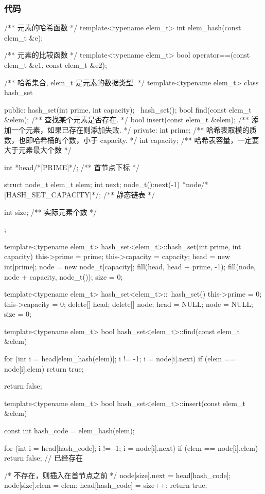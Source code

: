 \subsubsection{代码}
\begin{Codex}[label=hash_set.hpp]
/** 元素的哈希函数  */
template<typename elem_t>
int elem_hash(const elem_t &e);

/** 元素的比较函数  */
template<typename elem_t>
bool operator==(const elem_t &e1, const elem_t &e2);

/** 哈希集合, elem_t 是元素的数据类型. */
template<typename elem_t>
class hash_set {
public:
    hash_set(int prime, int capacity);
    ~hash_set();
    bool find(const elem_t &elem); /** 查找某个元素是否存在. */
    bool insert(const elem_t &elem); /** 添加一个元素，如果已存在则添加失败. */
private:
    int prime; /** 哈希表取模的质数，也即哈希桶的个数，小于 capacity. */
    int capacity; /** 哈希表容量，一定要大于元素最大个数  */

    int *head/*[PRIME]*/; /** 首节点下标 */

    struct node_t {
        elem_t elem;
        int next;
        node_t():next(-1) {}
    } *node/*[HASH_SET_CAPACITY]*/; /** 静态链表 */

    int size; /** 实际元素个数 */
};

template<typename elem_t>
hash_set<elem_t>::hash_set(int prime, int capacity) {
    this->prime = prime;
    this->capacity = capacity;
    head = new int[prime];
    node = new node_t[capacity];
    fill(head, head + prime, -1);
    fill(node, node + capacity, node_t());
    size = 0;
}

template<typename elem_t>
hash_set<elem_t>::~hash_set() {
    this->prime = 0;
    this->capacity = 0;
    delete[] head;
    delete[] node;
    head = NULL;
    node = NULL;
    size = 0;
}

template<typename elem_t>
bool hash_set<elem_t>::find(const elem_t &elem) {
    for (int i = head[elem_hash(elem)]; i != -1; i = node[i].next)
        if (elem == node[i].elem) return true;

    return false;
}

template<typename elem_t>
bool hash_set<elem_t>::insert(const elem_t &elem) {
    const int hash_code = elem_hash(elem);

    for (int i = head[hash_code]; i != -1; i = node[i].next)
        if (elem == node[i].elem) return false; // 已经存在

    /* 不存在，则插入在首节点之前 */
    node[size].next = head[hash_code];
    node[size].elem = elem;
    head[hash_code] = size++;
    return true;
}
\end{Codex}


